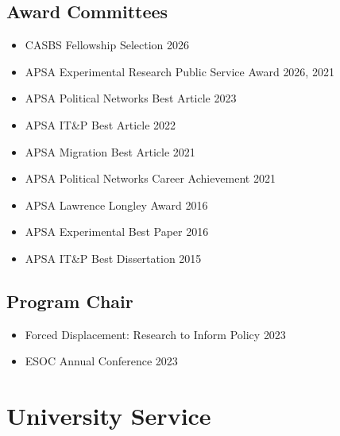 \documentclass[10pt,a4paper]{article}
\begin{document}
\subsection*{Award Committees}
\begin{itemize}[leftmargin=1em, itemsep=1pt, topsep=2pt, label=\textcolor{secondary}{$\bullet$}]
\item CASBS Fellowship Selection \hfill \textcolor{secondary}{2026}
\item APSA Experimental Research Public Service Award \hfill \textcolor{secondary}{2026, 2021}
\item APSA Political Networks Best Article \hfill \textcolor{secondary}{2023}
\item APSA IT\&P Best Article \hfill \textcolor{secondary}{2022}
\item APSA Migration Best Article \hfill \textcolor{secondary}{2021}
\item APSA Political Networks Career Achievement \hfill \textcolor{secondary}{2021}
\item APSA Lawrence Longley Award \hfill \textcolor{secondary}{2016}
\item APSA Experimental Best Paper \hfill \textcolor{secondary}{2016}
\item APSA IT\&P Best Dissertation \hfill \textcolor{secondary}{2015}
\end{itemize}

\subsection*{Program Chair}
\begin{itemize}[leftmargin=1em, itemsep=1pt, topsep=2pt, label=\textcolor{secondary}{$\bullet$}]
\item Forced Displacement: Research to Inform Policy \hfill \textcolor{secondary}{2023}
\item ESOC Annual Conference \hfill \textcolor{secondary}{2023}
\end{itemize}

\section{University Service}
\end{document}
